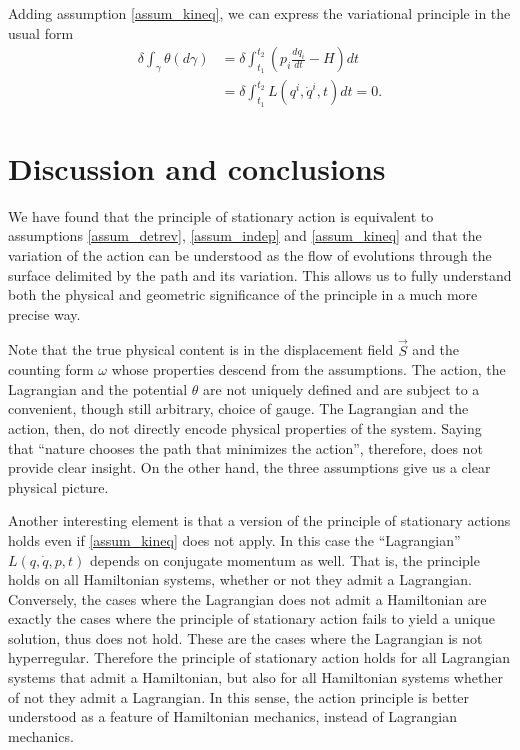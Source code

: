 \documentclass[fleqn,10pt]{wlscirep}
\begin{document}
Adding assumption \ref{assum_kineq}, we can express the variational principle in the usual form
\begin{equation}\label{mdof_Lagrangian}
	\begin{aligned}
		\delta \int_{\gamma} \theta(d\gamma) &= \delta \int^{t_2}_{t_1}\left( p_i \frac{dq_i}{dt} - H \right) dt \\
		 &= \delta \int^{t_2}_{t_1}L(q^i, \dot{q}^i, t) dt = 0.
	\end{aligned}
\end{equation}

\section*{Discussion and conclusions}

We have found that the principle of stationary action is equivalent to assumptions \ref{assum_detrev}, \ref{assum_indep} and \ref{assum_kineq} and that the variation of the action can be understood as the flow of evolutions through the surface delimited by the path and its variation. This allows us to fully understand both the physical and geometric significance of the principle in a much more precise way.

Note that the true physical content is in the displacement field $\vec{S}$ and the counting form $\omega$ whose properties descend from the assumptions. The action, the Lagrangian and the potential $\theta$ are not uniquely defined and are subject to a convenient, though still arbitrary, choice of gauge. The Lagrangian and the action, then, do not directly encode physical properties of the system. Saying that ``nature chooses the path that minimizes the action'', therefore, does not provide clear insight. On the other hand, the three assumptions give us a clear physical picture.

Another interesting element is that a version of the principle of stationary actions holds even if \ref{assum_kineq} does not apply. In this case the ``Lagrangian'' $L(q,\dot{q},p,t)$ depends on conjugate momentum as well. That is, the principle holds on all Hamiltonian systems, whether or not they admit a Lagrangian. Conversely, the cases where the Lagrangian does not admit a Hamiltonian are exactly the cases where the principle of stationary action fails to yield a unique solution, thus does not hold. These are the cases where the Lagrangian is not hyperregular. Therefore the principle of stationary action holds for all Lagrangian systems that admit a Hamiltonian, but also for all Hamiltonian systems whether of not they admit a Lagrangian. In this sense, the action principle is better understood as a feature of Hamiltonian mechanics, instead of Lagrangian mechanics\cite{souriau1970structure, arnold1989mathematical}.
\end{document}
